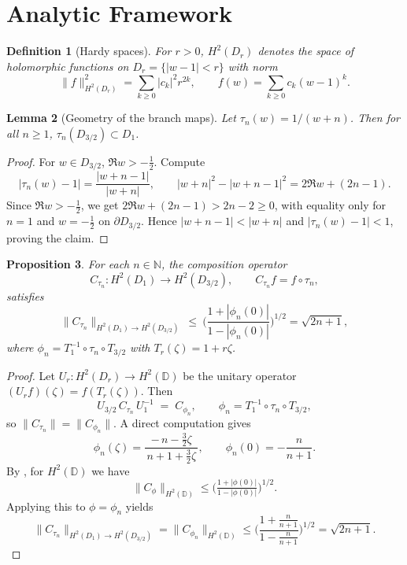 \documentclass[11pt]{article}
\newtheorem{definition}{Definition}[section]
\newtheorem{lemma}[definition]{Lemma}
\newtheorem{proposition}[definition]{Proposition}
\begin{document}
\section{Analytic Framework}\label{sec:analytic-bounds}

\begin{definition}[Hardy spaces]
For \(r>0\), \(H^2(D_r)\) denotes the space of holomorphic functions on
\(D_r=\{|w-1|<r\}\) with norm
\[
\|f\|_{H^2(D_r)}^2=\sum_{k\ge0}|c_k|^2 r^{2k},
\qquad f(w)=\sum_{k\ge0}c_k(w-1)^k.
\]
\end{definition}

\begin{lemma}[Geometry of the branch maps]
Let \(\tau_n(w)=1/(w+n)\).
Then for all \(n\ge1\), \(\tau_n(D_{3/2})\subset D_1\).
\end{lemma}

\begin{proof}
For \(w\in D_{3/2}\), \(\Re w>-\tfrac12\).
Compute
\[
|\tau_n(w)-1|=\frac{|w+n-1|}{|w+n|},
\qquad
|w+n|^2-|w+n-1|^2=2\Re w+(2n-1).
\]
Since \(\Re w>-\tfrac12\), we get \(2\Re w+(2n-1)>2n-2\ge0\),
with equality only for \(n=1\) and \(w=-\tfrac12\) on \(\partial D_{3/2}\).
Hence \(|w+n-1|<|w+n|\) and \(|\tau_n(w)-1|<1\), proving the claim.
\end{proof}

\begin{proposition}
\label{prop:branch-H2}
For each $n\in\mathbb N$, the composition operator
\[
C_{\tau_n}:H^2(D_1)\to H^2(D_{3/2}),\qquad C_{\tau_n}f=f\circ\tau_n,
\]
satisfies
\[
\|C_{\tau_n}\|_{H^2(D_1)\to H^2(D_{3/2})}
\ \le\
\Big(\frac{1+|\phi_n(0)|}{1-|\phi_n(0)|}\Big)^{1/2}
=\sqrt{2n+1},
\]
where $\phi_n=T_1^{-1}\circ\tau_n\circ T_{3/2}$ with $T_r(\zeta)=1+r\zeta$.
\end{proposition}

\begin{proof}
Let $U_r:H^2(D_r)\to H^2(\mathbb D)$ be the unitary operator $(U_r f)(\zeta)=f(T_r(\zeta))$.
Then
\[
U_{3/2}\, C_{\tau_n}\, U_1^{-1} \;=\; C_{\phi_n},
\qquad
\phi_n=T_1^{-1}\circ\tau_n\circ T_{3/2},
\]
so $\|C_{\tau_n}\|=\|C_{\phi_n}\|$. A direct computation gives
\[
\phi_n(\zeta)=\frac{-\,n-\tfrac32\zeta}{\,n+1+\tfrac32\zeta\,},
\qquad
\phi_n(0)=-\frac{n}{n+1}.
\]
By \cite[Thm.~3.6]{CowenMacCluer2019}, for $H^2(\mathbb D)$ we have
\[
\|C_{\phi}\|_{H^2(\mathbb D)}\le\big(\tfrac{1+|\phi(0)|}{1-|\phi(0)|}\big)^{1/2}.
\]
Applying this to $\phi=\phi_n$ yields
\[
\|C_{\tau_n}\|_{H^2(D_1)\to H^2(D_{3/2})}
=\|C_{\phi_n}\|_{H^2(\mathbb D)}
\le \Big(\frac{1+\frac{n}{n+1}}{1-\frac{n}{n+1}}\Big)^{1/2}
=\sqrt{2n+1}.
\]
\end{proof}
\end{document}
